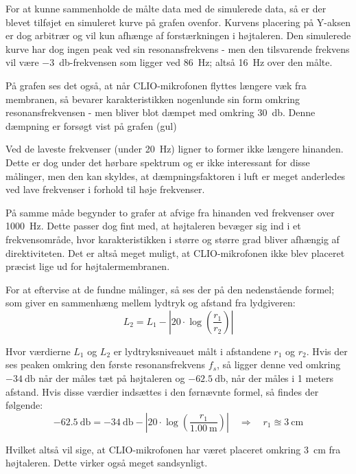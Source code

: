 \newpage
For at kunne sammenholde de målte data med de simulerede data, så er der blevet tilføjet en simuleret kurve på grafen ovenfor. Kurvens placering på Y-aksen er dog arbitrær og vil kun afhænge af forstærkningen i højtaleren. Den simulerede kurve har dog ingen peak ved sin resonansfrekvens - men den tilsvarende frekvens vil være \SI{-3}{\decibel}-frekvensen som ligger ved \SI{86}{\hertz}; altså \SI{16}{\hertz} over den målte.

På grafen ses det også, at når CLIO-mikrofonen flyttes længere væk fra membranen, så bevarer karakteristikken nogenlunde sin form omkring resonansfrekvensen - men bliver blot dæmpet med omkring \SI{30}{\decibel}. Denne dæmpning er forsøgt vist på grafen (gul)

Ved de laveste frekvenser (under \SI{20}{\hertz}) ligner to former ikke længere hinanden. Dette er dog under det hørbare spektrum og er ikke interessant for disse målinger, men den kan skyldes, at dæmpningsfaktoren i luft er meget anderledes ved lave frekvenser i forhold til høje frekvenser.

På samme måde begynder to grafer at afvige fra hinanden ved frekvenser over \SI{1000}{\hertz}. Dette passer dog fint med, at højtaleren bevæger sig ind i et frekvensområde, hvor karakteristikken i større og større grad bliver afhængig af direktiviteten. Det er altså meget muligt, at CLIO-mikrofonen ikke blev placeret præcist lige ud for højtalermembranen.

For at eftervise at de fundne målinger, så ses der på den nedenstående formel; som giver en sammenhæng mellem lydtryk og afstand fra lydgiveren:
\begin{equation}
L_2 = L_1 - \left| 20 \cdot \log \left( \frac{r_1}{r_2} \right) \right|
\end{equation}

Hvor værdierne $L_1$ og $L_2$ er lydtryksniveauet målt i afstandene $r_1$ og $r_2$. Hvis der ses peaken omkring den første resonansfrekvens $f_s$, så ligger denne ved omkring $-\SI{34}{\decibel}$ når der måles tæt på højtaleren og $-\SI{62.5}{\decibel}$, når der måles i 1 meters afstand. Hvis disse værdier indsættes i den førnævnte formel, så findes der følgende:
\begin{equation}
\SI{-62.5}{\decibel} = \SI{-34}{\decibel} - \left| 20 \cdot \log \left( \frac{r_1}{\SI{1.00}{\meter}} \right)\right| \quad \Rightarrow \quad r_1 \approxeq \SI{3}{\centi\meter}
\end{equation}

Hvilket altså vil sige, at CLIO-mikrofonen har været placeret omkring \SI{3}{\centi\meter} fra højtaleren. Dette virker også meget sandsynligt.